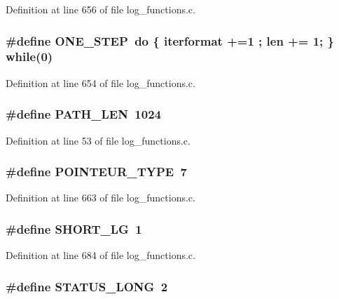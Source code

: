 Definition at line 656 of file log\_\-functions.c.
\subsubsection[{ONE\_\-STEP}]{\setlength{\rightskip}{0pt plus 5cm}\#define ONE\_\-STEP~do \{ iterformat +=1 ; len += 1; \} while(0)}\label{log__functions_8c_a4869604911231c5078f2f1bb950190b0}


Definition at line 654 of file log\_\-functions.c.
\subsubsection[{PATH\_\-LEN}]{\setlength{\rightskip}{0pt plus 5cm}\#define PATH\_\-LEN~1024}\label{log__functions_8c_a943afdb7a415a72b444ecbc5c9286fae}


Definition at line 53 of file log\_\-functions.c.
\subsubsection[{POINTEUR\_\-TYPE}]{\setlength{\rightskip}{0pt plus 5cm}\#define POINTEUR\_\-TYPE~7}\label{log__functions_8c_a2319cd78a001d66f293813c037507116}


Definition at line 663 of file log\_\-functions.c.
\subsubsection[{SHORT\_\-LG}]{\setlength{\rightskip}{0pt plus 5cm}\#define SHORT\_\-LG~1}\label{log__functions_8c_a33367c46a358a1ce6b6957a8b3b952c2}


Definition at line 684 of file log\_\-functions.c.
\subsubsection[{STATUS\_\-LONG}]{\setlength{\rightskip}{0pt plus 5cm}\#define STATUS\_\-LONG~2}\label{log__functions_8c_ae59d2356f020cd2ac450fb8c2b20ea6d}



